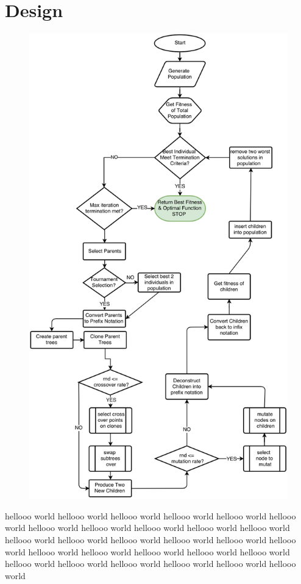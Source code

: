 \documentclass[11pt]{article}
\begin{document}
\section{Design}
\begin{figure}[h]
\centering
\includegraphics[scale = .67]{flown}
\end{figure}
hellooo world hellooo world hellooo world hellooo world hellooo world hellooo world hellooo world hellooo world hellooo world hellooo world hellooo world hellooo world hellooo world hellooo world hellooo world hellooo world hellooo world hellooo world hellooo world hellooo world hellooo world hellooo world hellooo world hellooo world hellooo world hellooo world hellooo world hellooo world 
\end{document}
